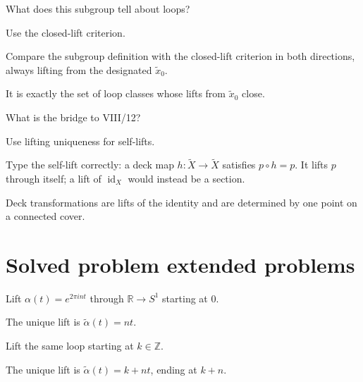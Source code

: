 \begin{exercise}\label{exr:viii11-23}
What does this subgroup tell about loops?
\end{exercise}
\begin{hint}
Use the closed-lift criterion.

Compare the subgroup definition with the closed-lift criterion in both directions, always lifting from the designated \(\tilde x_0\).
\end{hint}
\begin{solution}
It is exactly the set of loop classes whose lifts from \(\tilde x_0\) close.
\end{solution}

\begin{exercise}\label{exr:viii11-24}
What is the bridge to VIII/12?
\end{exercise}
\begin{hint}
Use lifting uniqueness for self-lifts.

Type the self-lift correctly: a deck map \(h:\widetilde X\to\widetilde X\) satisfies \(p\circ h=p\). It lifts \(p\) through itself; a lift of \(\operatorname{id}_X\) would instead be a section.
\end{hint}
\begin{solution}
Deck transformations are lifts of the identity and are determined by one point on a connected cover.
\end{solution}


\section{Solved problem extended problems}

\begin{problem}\label{prob:viii11-01}
Lift \(\alpha(t)=e^{2\pi int}\) through \(\mathbb R\to S^1\) starting at \(0\).
\end{problem}
\begin{solution}
The unique lift is \(\widetilde\alpha(t)=nt\).
\end{solution}

\begin{problem}\label{prob:viii11-02}
Lift the same loop starting at \(k\in\mathbb Z\).
\end{problem}
\begin{solution}
The unique lift is \(\widetilde\alpha(t)=k+nt\), ending at \(k+n\).
\end{solution}

